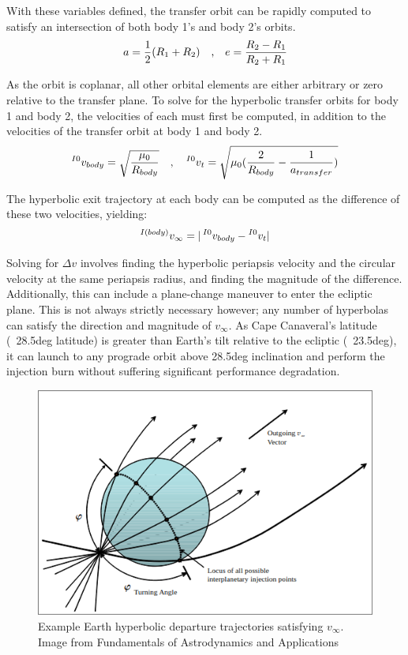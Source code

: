 \documentclass[conference]{IEEEtran}
\begin{document}
	With these variables defined, the transfer orbit can be rapidly computed to satisfy an intersection of both body 1's and body 2's orbits.
	\[\lstdefinestyle{ieee-tight}{
		basicstyle=\ttfamily\tiny,  %
		numbers=left,
		numberstyle=\tiny\color{gray},
		breaklines=true,
		frame=single,
		captionpos=b,
		xleftmargin=0pt,
		xrightmargin=0pt,
		aboveskip=5pt,
		belowskip=5pt,
		language=Matlab
	}
	a = \frac{1}{2}(R_1 + R_2)
	\quad\text{,}\quad
	e = \frac{R_2 - R_1}{R_2 + R_1}
	\]
	
	As the orbit is coplanar, all other orbital elements are either arbitrary or zero relative to the transfer plane. To solve for the hyperbolic transfer orbits for body 1 and body 2, the velocities of each must first be computed, in addition to the velocities of the transfer orbit at body 1 and body 2.
	\[
		\prescript{I0}{}{v_{body}} = \sqrt{\frac{\mu_0}{R_{body}}}
		\quad\text{,}\quad
		\prescript{I0}{}{v_{t}} = \sqrt{\mu_0 (\frac{2}{R_{body}} - \frac{1}{a_{transfer}})}
	\]			
	
	The hyperbolic exit trajectory at each body can be computed as the difference of these two velocities, yielding:
	\[
	\prescript{I(body)}{}{v_{\infty}} = |\prescript{I0}{}{v_{body}} - \prescript{I0}{}{v_{t}}|
	\]
	
	Solving for $\Delta v$ involves finding the hyperbolic periapsis velocity and the circular velocity at the same periapsis radius, and finding the magnitude of the difference. Additionally, this can include a plane-change maneuver to enter the ecliptic plane. This is not always strictly necessary however; any number of hyperbolas can satisfy the direction and magnitude of $v_{\infty}$. As Cape Canaveral's latitude (~28.5deg latitude) is greater than Earth's tilt relative to the ecliptic (~23.5deg), it can launch to any prograde orbit above 28.5deg inclination and perform the injection burn without suffering significant performance degradation.
	
	\begin{figure}[H]
		\centerline{\includegraphics[width=\linewidth]{fig1.png}}
		\caption{Example Earth hyperbolic departure trajectories satisfying $v_{\infty}$. Image from Fundamentals of Astrodynamics and Applications \cite{b2}}
		\label{fig}
	\end{figure}
	
\end{document}
